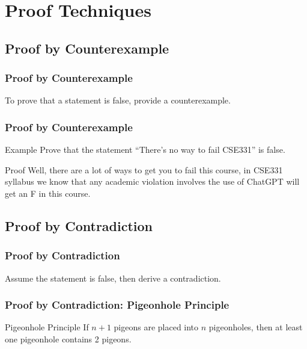 \documentclass[t]{beamer}
\begin{document}

    \section{Proof Techniques}


        \subsection{Proof by Counterexample}
            \begin{frame}
                \frametitle{Proof by Counterexample}
                To prove that a statement is false, provide a counterexample.
            \end{frame}

            \begin{frame}
                \frametitle{Proof by Counterexample}
                \begin{block}{Example}
                    Prove that the statement ``There's no way to fail CSE331'' is false.
                \end{block}
                \begin{block}{Proof}
                    Well, there are a lot of ways to get you to fail this course, in CSE331 syllabus we know that 
                    \alert{any academic violation involves the use of ChatGPT will get an F in this course}.
                \end{block}
            \end{frame}

        \subsection{Proof by Contradiction}
            \begin{frame}
                \frametitle{Proof by Contradiction}
                Assume the statement is false, then derive a contradiction.
            \end{frame}

            \begin{frame}
                \frametitle{Proof by Contradiction: Pigeonhole Principle}
                \begin{block}{Pigeonhole Principle}
                    If $n+1$ pigeons are placed into $n$ pigeonholes, then at least one pigeonhole contains 2 pigeons.
                \end{block}
            \end{frame}
\end{document}
